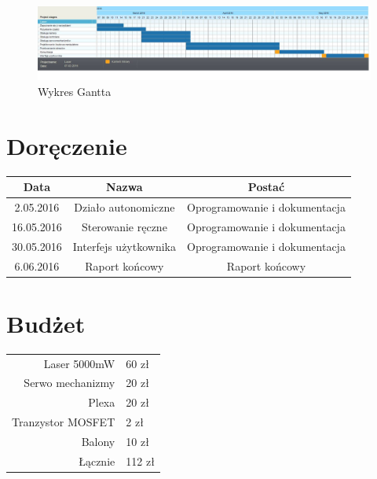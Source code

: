 \documentclass[10pt, a4paper]{article}%
\begin{document}
\begin{landscape}
\begin{figure}[h]
\begin{center}

\includegraphics[width=1.25\textwidth,height = 0.5\textwidth]{gantt3}
\caption{Wykres Gantta}
\end{center}
\end{figure}
\end{landscape}




\newpage


\section{Doręczenie}

\begin{tabular}{|c|c|c|} \hline
	
	Data & Nazwa & Postać\\
	\hline
  2.05.2016 & Działo autonomiczne & Oprogramowanie i dokumentacja \\
	\hline
	16.05.2016 & Sterowanie ręczne & Oprogramowanie i dokumentacja\\
	\hline
	30.05.2016 & Interfejs użytkownika & Oprogramowanie i dokumentacja \\
	\hline
	6.06.2016 &  Raport końcowy & Raport końcowy\\
	\hline
\end{tabular}

\section{Budżet}

\begin{tabular}{|r|l|} \hline

  Laser 5000mW & 60 zł \\
  Serwo mechanizmy & 20 zł \\
	Plexa & 20 zł\\
	Tranzystor MOSFET & 2 zł \\
	Balony & 10 zł \\
  \hline
  Łącznie & 112 zł \\
  \hline

\end{tabular}
\end{document}
